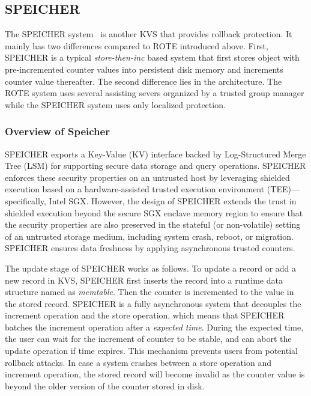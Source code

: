 \subsection{SPEICHER}

The SPEICHER system~\cite{} is another KVS that provides rollback protection.
It mainly has two differences compared to ROTE introduced above. First, 
SPEICHER is a typical \textit{store-then-inc} based system that first stores 
object with pre-incremented counter values into persistent disk memory and increments
counter value thereafter. The second difference lies in the architecture. The ROTE system
uses several assisting severs organized by a trusted group manager while the SPEICHER system 
uses only localized protection.


\subsubsection{Overview of Speicher}

SPEICHER exports a Key-Value (KV) interface backed by Log-Structured Merge Tree (LSM) for supporting secure data storage and query operations. SPEICHER enforces these security properties on an untrusted host by leveraging shielded execution based on a hardware-assisted trusted execution environment (TEE)—specifically, Intel SGX. However, the design of SPEICHER extends the trust in shielded execution beyond the secure SGX enclave memory region to ensure that the security properties are also preserved in the stateful (or non-volatile) setting of an untrusted storage medium, including system crash, reboot, or migration. SPEICHER ensures data freshness by applying asynchronous trusted counters. 

The update stage of SPEICHER works as follows. To update a record or add a new 
record in KVS, SPEICHER first inserts the record into a runtime data structure
named as \textit{memtable}. Then the counter is incremented to the value in 
the stored record. SPEICHER is a fully asynchronous system that decouples the 
increment operation and the store operation, which means that SPEICHER batches
the increment operation after a \textit{expected time}. During the expected 
time, the user can wait for the increment of counter to be stable, and can 
abort the update operation if time expires. This mechanism prevents users 
from potential rollback attacks. In case a system crashes between a store
operation and increment operation, the stored record will become invalid as 
the counter value is beyond the older version of the counter stored in disk.


